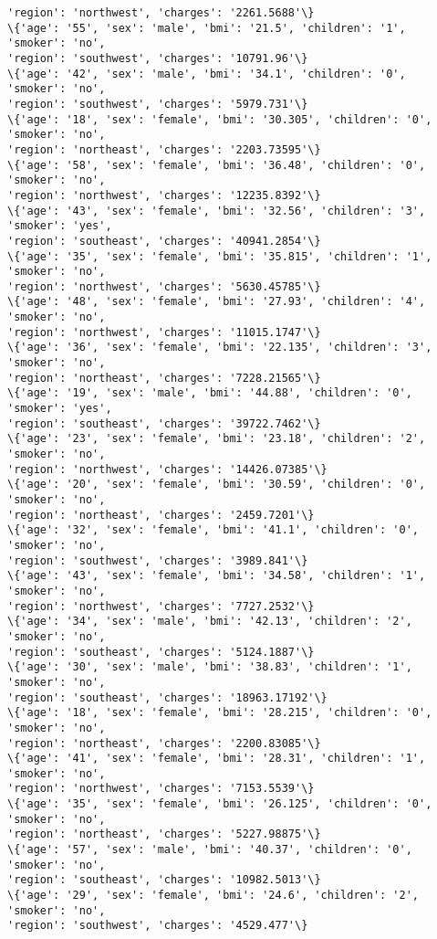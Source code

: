 \documentclass[11pt]{article}
\begin{document}
\begin{Verbatim}[commandchars=\\\{\}]
'region': 'northwest', 'charges': '2261.5688'\}
\{'age': '55', 'sex': 'male', 'bmi': '21.5', 'children': '1', 'smoker': 'no',
'region': 'southwest', 'charges': '10791.96'\}
\{'age': '42', 'sex': 'male', 'bmi': '34.1', 'children': '0', 'smoker': 'no',
'region': 'southwest', 'charges': '5979.731'\}
\{'age': '18', 'sex': 'female', 'bmi': '30.305', 'children': '0', 'smoker': 'no',
'region': 'northeast', 'charges': '2203.73595'\}
\{'age': '58', 'sex': 'female', 'bmi': '36.48', 'children': '0', 'smoker': 'no',
'region': 'northwest', 'charges': '12235.8392'\}
\{'age': '43', 'sex': 'female', 'bmi': '32.56', 'children': '3', 'smoker': 'yes',
'region': 'southeast', 'charges': '40941.2854'\}
\{'age': '35', 'sex': 'female', 'bmi': '35.815', 'children': '1', 'smoker': 'no',
'region': 'northwest', 'charges': '5630.45785'\}
\{'age': '48', 'sex': 'female', 'bmi': '27.93', 'children': '4', 'smoker': 'no',
'region': 'northwest', 'charges': '11015.1747'\}
\{'age': '36', 'sex': 'female', 'bmi': '22.135', 'children': '3', 'smoker': 'no',
'region': 'northeast', 'charges': '7228.21565'\}
\{'age': '19', 'sex': 'male', 'bmi': '44.88', 'children': '0', 'smoker': 'yes',
'region': 'southeast', 'charges': '39722.7462'\}
\{'age': '23', 'sex': 'female', 'bmi': '23.18', 'children': '2', 'smoker': 'no',
'region': 'northwest', 'charges': '14426.07385'\}
\{'age': '20', 'sex': 'female', 'bmi': '30.59', 'children': '0', 'smoker': 'no',
'region': 'northeast', 'charges': '2459.7201'\}
\{'age': '32', 'sex': 'female', 'bmi': '41.1', 'children': '0', 'smoker': 'no',
'region': 'southwest', 'charges': '3989.841'\}
\{'age': '43', 'sex': 'female', 'bmi': '34.58', 'children': '1', 'smoker': 'no',
'region': 'northwest', 'charges': '7727.2532'\}
\{'age': '34', 'sex': 'male', 'bmi': '42.13', 'children': '2', 'smoker': 'no',
'region': 'southeast', 'charges': '5124.1887'\}
\{'age': '30', 'sex': 'male', 'bmi': '38.83', 'children': '1', 'smoker': 'no',
'region': 'southeast', 'charges': '18963.17192'\}
\{'age': '18', 'sex': 'female', 'bmi': '28.215', 'children': '0', 'smoker': 'no',
'region': 'northeast', 'charges': '2200.83085'\}
\{'age': '41', 'sex': 'female', 'bmi': '28.31', 'children': '1', 'smoker': 'no',
'region': 'northwest', 'charges': '7153.5539'\}
\{'age': '35', 'sex': 'female', 'bmi': '26.125', 'children': '0', 'smoker': 'no',
'region': 'northeast', 'charges': '5227.98875'\}
\{'age': '57', 'sex': 'male', 'bmi': '40.37', 'children': '0', 'smoker': 'no',
'region': 'southeast', 'charges': '10982.5013'\}
\{'age': '29', 'sex': 'female', 'bmi': '24.6', 'children': '2', 'smoker': 'no',
'region': 'southwest', 'charges': '4529.477'\}

\end{Verbatim}
\end{document}
